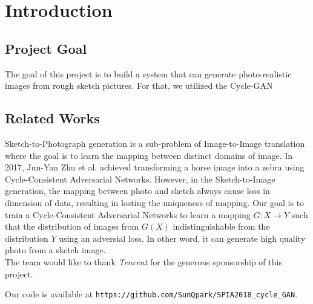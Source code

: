 \chapter{Introduction}\label{Ch:Introduction}

\section{Project Goal}

The goal of this project is to build a system that can generate photo-realistic images from rough sketch pictures. For that, we utilized the Cycle-GAN~\cite{CycleGAN} 

\section{Related Works}

Sketch-to-Photograph generation is a sub-problem of Image-to-Image translation where the goal is to learn the mapping between distinct domains of image. 
In 2017, Jun-Yan Zhu et al. achieved transforming a horse image into a zebra using Cycle-Consistent Adversarial Networks. However, in the Sketch-to-Image generation, the mapping between photo and sketch always cause loss in dimension of data, resulting in losting the uniqueness of mapping. Our goal is to train a Cycle-Consistent Adversarial Networks to learn a mapping \(G:X \rightarrow Y\) such that the distribution of images from \(G(X)\) indistinguishable from the distribution \(Y\) using an adversial loss. In other word, it can generate high quality photo from a sketch image.\\%


The team would like to thank \emph{Tencent} for the generous sponsorship of this project. 



Our code is available at \texttt{https://github.com/SunQpark/SPIA2018\_cycle\_GAN}.




\endinput
